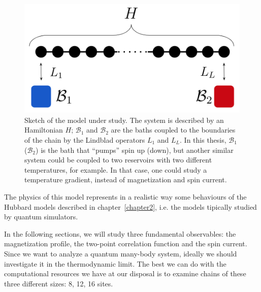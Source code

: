 \begin{figure}[H]
    \centering
    \includegraphics[scale=0.6]{Figures/sketch_model.png}
    \captionsetup{width=1.\linewidth}
    \caption{Sketch of the model under study. The system is described by an Hamiltonian $H$; $\mathcal{B}_1$ and $\mathcal{B}_2$ are the baths coupled to the boundaries of the chain by the Lindblad operators $L_1$ and $L_L$. In this thesis, $\mathcal{B}_1$ ($\mathcal{B}_2$) is the bath that ``pumps'' spin up (down), but another similar system could be coupled to two reservoirs with two different temperatures, for example. In that case, one could study a temperature gradient, instead of magnetization and spin current.}
    \label{fig:sketch_model}
\end{figure}


The physics of this model represents in a realistic way some behaviours of the Hubbard models described in chapter~\ref{chapter2}, i.e. the models tipically studied by quantum simulators.

In the following sections, we will study three fundamental observables: the magnetization profile, the two-point correlation function and the spin current. Since we want to analyze a quantum many-body system, ideally we should investigate it in the thermodynamic limit. The best we can do with the computational resources we have at our disposal is to examine chains of these three different sizes: 8, 12, 16 sites.

